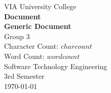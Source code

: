 \thispagestyle{empty}
\vspace*{0.15\textheight}
\begin{center}
    {\Large VIA University College}\\[2em]
    {\huge \textbf{Document}}\\[0.5em]
    {\Large \textbf{Generic Document}}\\[0.5em]
    {\Large Group 3}\\[3em]
    {\large Character Count: $charcount$}\\[0.5em]
    {\large Word Count: $wordcount$}\\[2em]
    {\Large Software Technology Engineering}\\[1em]
    {\Large 3rd Semester}\\[1em]
    {\large \today}\\[1em]
\end{center}
\vfill
\clearpage